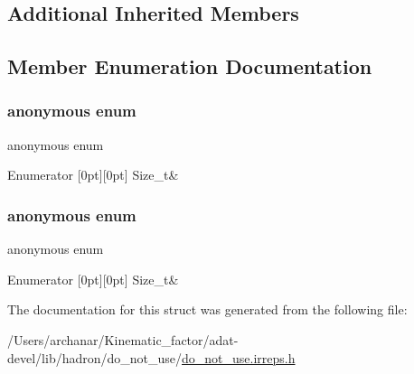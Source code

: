 \subsection*{Additional Inherited Members}


\subsection{Member Enumeration Documentation}
\mbox{\label{structHadron_1_1ZeroHelicityRep_aa7294c546ade93e6aa4f1bbc2bf66a32}} 
\subsubsection{\texorpdfstring{anonymous enum}{anonymous enum}}
{\footnotesize\ttfamily anonymous enum}

\begin{DoxyEnumFields}{Enumerator}
[0pt][0pt]{}\mbox{\label{structHadron_1_1ZeroHelicityRep_aa7294c546ade93e6aa4f1bbc2bf66a32a646a375ab5183b33023e33d69156fa52}} 
Size\+\_\+t&\\
\hline

\end{DoxyEnumFields}
\mbox{\label{structHadron_1_1ZeroHelicityRep_aacdc790afcd692fa3a1b3dd8980bfc7b}} 
\subsubsection{\texorpdfstring{anonymous enum}{anonymous enum}}
{\footnotesize\ttfamily anonymous enum}

\begin{DoxyEnumFields}{Enumerator}
[0pt][0pt]{}\mbox{\label{structHadron_1_1ZeroHelicityRep_aa7294c546ade93e6aa4f1bbc2bf66a32a646a375ab5183b33023e33d69156fa52}} 
Size\+\_\+t&\\
\hline

\end{DoxyEnumFields}


The documentation for this struct was generated from the following file\+:\begin{DoxyCompactItemize}
\item 
/\+Users/archanar/\+Kinematic\+\_\+factor/adat-\/devel/lib/hadron/do\+\_\+not\+\_\+use/\mbox{\hyperlink{adat-devel_2lib_2hadron_2do__not__use_2do__not__use_8irreps_8h}{do\+\_\+not\+\_\+use.\+irreps.\+h}}\end{DoxyCompactItemize}
